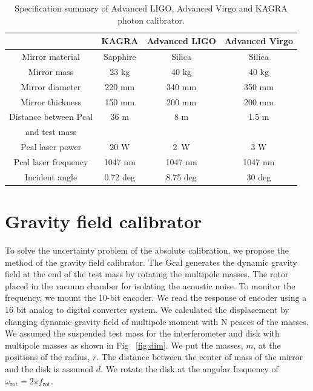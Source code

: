 \documentclass[%
 reprint,
superscriptaddress,
 amsmath,amssymb,
 aps,
]{revtex4-1}
\begin{document}
\begin{table}
\begin{center}
\caption{Specification summary of Advanced LIGO, Advanced Virgo and KAGRA photon calibrator. \label{pcal}}
\footnotesize
\begin{tabular}{cccc}
\hline
& KAGRA& Advanced LIGO& Advanced Virgo \\
\hline
Mirror material & Sapphire & Silica & Silica \\
 Mirror mass & 23 kg & 40 kg & 40 kg \\
  Mirror diameter & 220 mm & 340 mm & 350 mm \\
    Mirror thickness & 150 mm & 200 mm & 200 mm \\
 Distance between Pcal & 36 m & 8 m & 1.5 m \\
and test mass &&& \\
  Pcal laser power & 20 W & 2~W & 3 W \\
  Pcal laser frequency & 1047 nm & 1047 nm &1047 nm\\
  Incident angle& 0.72 deg & 8.75 deg &30 deg \\
  \hline
\end{tabular}
\end{center}
\end{table}

\section{Gravity field calibrator} \label{sec:Gcal}
To solve the uncertainty problem of the absolute calibration, we propose the method of the gravity field calibrator. The Gcal generates the dynamic gravity field at the end of the test mass by rotating the multipole masses. The rotor placed in the vacuum chamber for isolating the acoustic noise. To monitor the frequency, we mount the 10-bit encoder. We read the response of encoder using a 16 bit analog to digital converter  system.
We calculated the displacement by changing dynamic gravity field of multipole moment with N peaces of the masses.
We assumed the suspended test mass for the interferometer and disk with multipole masses as shown in Fig ~\ref{fig:dim}.
We put the masses, $m$, at the positions of the radius, $r$. The distance between the center of mass of the mirror and the disk is assumed $d$.
We rotate the disk at the angular frequency of $\omega_{\mathrm{rot}}=2\pi f_{\mathrm{rot}}$.
\end{document}

